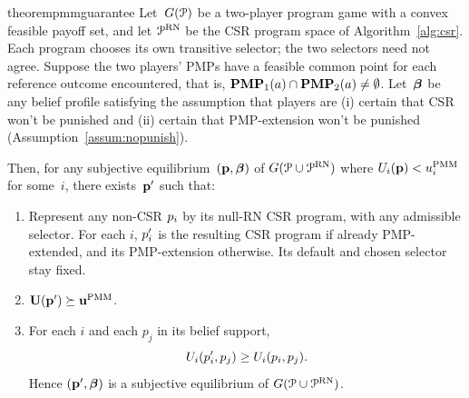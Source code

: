 \documentclass[sigconf]{aamas}
\newcommand{\allprogreneg}{\allprog^{\text{RN}}}
\theoremstyle{definition}
\begin{document}
\begin{restatable}{theorem}{pmmguarantee}
\label{prop:yudpoint}
Let~$G(\mathcal{P})$ be a two-player program game with a convex
feasible payoff set, and let $\allprogreneg$ be the CSR program space
of Algorithm~\ref{alg:csr}. Each program chooses its own transitive
selector; the two selectors need not agree.
Suppose the two players' PMPs have a feasible common point for each
reference outcome encountered, that is,
$\mathbf{PMP}_1(a)\cap\mathbf{PMP}_2(a)\ne\emptyset$.
Let~$\boldsymbol{\beta}$ be any belief profile
satisfying the assumption 
that players are (i) certain that CSR won't be punished and (ii) certain that
PMP-extension won't be punished (Assumption~\ref{assum:nopunish}). 


 Then,
 for any subjective equilibrium~$(\textbf{p}, \boldsymbol{\beta})$ of $\game(\allprog \cup \allprogreneg)$
 where $U_i(\textbf{p}) < u_i^{\textnormal{PMM}}$ 
 for some~$i$,
 there exists~$\textbf{p}'$
 such that:
    \begin{enumerate}
        \item Represent any non-CSR $p_i$ by its null-RN CSR
     program, with any admissible selector. For each $i$, $p_i'$
     is the resulting CSR program if already PMP-extended, and its
     PMP-extension otherwise. Its default and chosen selector stay fixed.
    \item $\textbf{U}(\textbf{p}') \succeq \textbf{u}^{\textnormal{PMM}}$.
    \item For each $i$ and each $p_j$ in its belief support,
      \[U_i(p_i',p_j)\geq U_i(p_i,p_j).\]
      Hence $(\textbf{p}', \boldsymbol{\beta})$
      is a subjective equilibrium
      of  $\game(\allprog \cup \allprogreneg)$.
    \end{enumerate}
\end{restatable}
\end{document}
